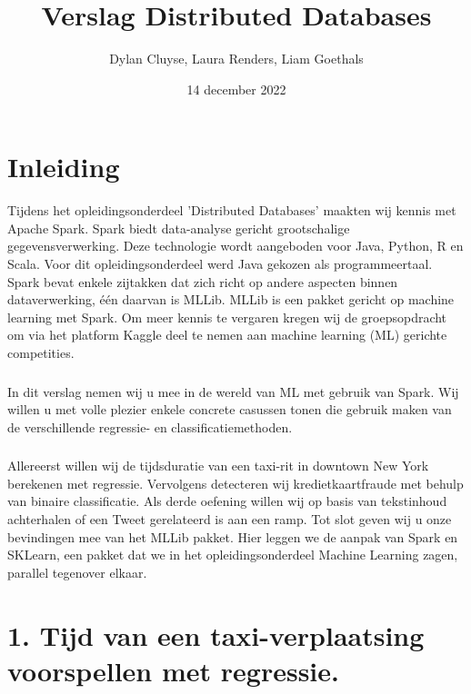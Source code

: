 \documentclass[a4paper,10pt,twoside]{report}
\title{Verslag Distributed Databases}
\author{Dylan {Cluyse}, Laura {Renders}, Liam {Goethals}}
\date{14 december 2022}
\begin{document}
\maketitle

\tableofcontents

\chapter*{Inleiding}

Tijdens het opleidingsonderdeel 'Distributed Databases' maakten wij kennis met Apache Spark. Spark biedt data-analyse gericht grootschalige gegevensverwerking. Deze technologie wordt aangeboden voor Java, Python, R en Scala. Voor dit opleidingsonderdeel werd Java gekozen als programmeertaal. Spark bevat enkele zijtakken dat zich richt op andere aspecten binnen dataverwerking, één daarvan is MLLib. MLLib is een pakket gericht op machine learning met Spark. Om meer kennis te vergaren kregen wij de groepsopdracht om via het platform Kaggle deel te nemen aan machine learning (ML) gerichte competities.

\subsection*{}

In dit verslag nemen wij u mee in de wereld van ML met gebruik van Spark. Wij willen u met volle plezier enkele concrete casussen tonen die gebruik maken van de verschillende regressie- en classificatiemethoden.

\subsection*{}

Allereerst willen wij de tijdsduratie van een taxi-rit in downtown New York berekenen met regressie. Vervolgens detecteren wij kredietkaartfraude met behulp van binaire classificatie. Als derde oefening willen wij op basis van tekstinhoud achterhalen of een Tweet gerelateerd is aan een ramp. Tot slot geven wij u onze bevindingen mee van het MLLib pakket. Hier leggen we de aanpak van Spark en SKLearn, een pakket dat we in het opleidingsonderdeel Machine Learning zagen, parallel tegenover elkaar.

\chapter*{1. Tijd van een taxi-verplaatsing voorspellen met regressie.}
\end{document}
